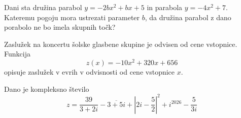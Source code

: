 \documentclass[addpoints]{exam}
\begin{document}
\begin{questions}

    \question[6]
        Dani sta družina parabol $y=-2bx^2+bx+5$ in parabola $y=-4x^2+7$.
        Kateremu pogoju mora ustrezati parameter $b$, da družina parabol z dano porabolo ne bo imela skupnih točk?

            \begin{solution}[8cm]

            \end{solution}


    \question
        Zaslužek na koncertu šolske glasbene skupine je odvisen od cene vstopnice.
        Funkcija $$z(x)=-10x^2+320x+656$$ opisuje zaslužek v evrih v odvisnosti od cene vstopnice $x$.
        

            \begin{solution}[3cm]

            \end{solution}


            \newpage
    \question
        Dano je kompleksno število $$z= \dfrac{39}{3+2i}-\overline{3+5i}+\left|2i-\frac{5}{2}\right|^2+i^{2026}-\dfrac{5}{3i} $$

\end{questions}
\end{document}
